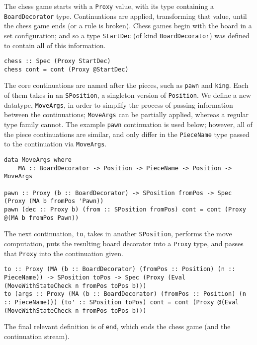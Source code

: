 \documentclass[12pt, a4paper, bibliography=totocnumbered]{scrartcl}
\begin{document}
The chess game starts with a \lstinline{Proxy} value, with its type containing a \lstinline{BoardDecorator} type. Continuations are applied, transforming that value, until the chess game ends (or a rule is broken). Chess games begin with the board in a set configuration; and so a type \lstinline{StartDec} (of kind \lstinline{BoardDecorator}) was defined to contain all of this information.

\begin{lstlisting}
chess :: Spec (Proxy StartDec)
chess cont = cont (Proxy @StartDec)
\end{lstlisting}

The core continuations are named after the pieces, such as \lstinline{pawn} and \lstinline{king}. Each of them takes in an \lstinline{SPosition}, a singleton version of \lstinline{Position}. We define a new datatype, \lstinline{MoveArgs}, in order to simplify the process of passing information between the continuations; \lstinline{MoveArgs} can be partially applied, whereas a regular type family cannot. The example \lstinline{pawn} continuation is used below; however, all of the piece continuations are similar, and only differ in the \lstinline{PieceName} type passed to the continuation via \lstinline{MoveArgs}.

\begin{lstlisting}
data MoveArgs where
    MA :: BoardDecorator -> Position -> PieceName -> Position -> MoveArgs

pawn :: Proxy (b :: BoardDecorator) -> SPosition fromPos -> Spec (Proxy (MA b fromPos 'Pawn))
pawn (dec :: Proxy b) (from :: SPosition fromPos) cont = cont (Proxy @(MA b fromPos Pawn))
\end{lstlisting}

The next continuation, \lstinline{to}, takes in another \lstinline{SPosition}, performs the move computation, puts the resulting board decorator into a \lstinline{Proxy} type, and passes that \lstinline{Proxy} into the continuation given.

\begin{lstlisting}
to :: Proxy (MA (b :: BoardDecorator) (fromPos :: Position) (n :: PieceName)) -> SPosition toPos -> Spec (Proxy (Eval (MoveWithStateCheck n fromPos toPos b)))
to (args :: Proxy (MA (b :: BoardDecorator) (fromPos :: Position) (n :: PieceName))) (to' :: SPosition toPos) cont = cont (Proxy @(Eval (MoveWithStateCheck n fromPos toPos b)))
\end{lstlisting}

The final relevant definition is of \lstinline{end}, which ends the chess game (and the continuation stream).
\end{document}
